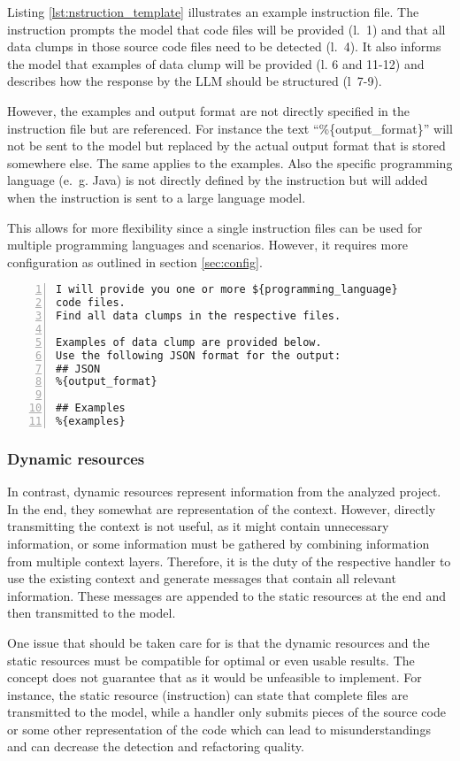 Listing \ref{lst:nstruction_template} illustrates an example instruction file.  The instruction prompts the model that code files will be provided (l.~1) and that all data clumps in those source code files need to be detected (l.~4). It also informs the model that examples of data clump will be provided (l. 6 and 11-12) and describes how the response by the \ac{LLM} should be structured (l~7-9). 

However, the examples and output format are not directly specified in the instruction file but are referenced. For instance the text \enquote{\%\{output\_format\}} will not be sent to the model but replaced by the actual output format that is stored somewhere else. The same applies to the examples. Also the specific programming language (e.~g. Java) is not directly defined by the instruction but will added when the instruction is sent to a large language model.

This allows for more flexibility since a single instruction files can be used for multiple programming languages and scenarios. However, it requires more configuration as outlined in section \ref{sec:config}.
\begin{lstlisting}[caption={Instruction file example}, label={lst:nstruction_template}, captionpos=b, numbers=left, ]
I will provide you one or more ${programming_language}
code files.
Find all data clumps in the respective files.

Examples of data clump are provided below.
Use the following JSON format for the output:
## JSON
%{output_format}

## Examples
%{examples}
\end{lstlisting}


\hfill
\subsubsection{Dynamic resources}

In contrast, dynamic resources represent information from the analyzed project. In the end, they somewhat are representation of the context. However, directly transmitting the context is not useful, as it might contain unnecessary information, or some information must be gathered by combining information from multiple context layers. Therefore, it is the duty of the respective handler to use the existing context and generate messages that contain all relevant information. These messages are appended to the static resources at the end and then transmitted to the model. 

One issue that should be taken care for is that the dynamic resources and the static resources must be compatible for optimal or even usable results. The concept does not guarantee that as it would be unfeasible to implement. For instance, the static resource (instruction) can state that complete files are transmitted to the model, while a handler only submits pieces of the source code or some other representation of the code which can lead to misunderstandings and can decrease the detection and refactoring quality. 
